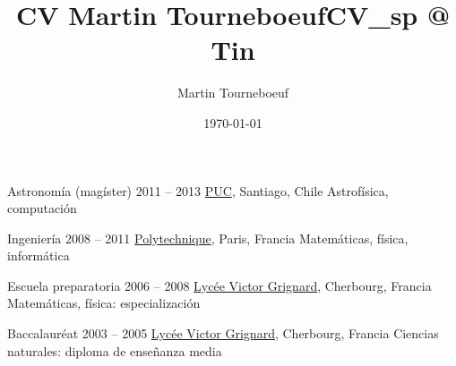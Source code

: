 \def\tbflanguage{spanish}

\ifx\HCode\undefined
  \providecommand\tbfbordertop{1.2}
  \providecommand\tbfborderleft{0.7}
  \providecommand\tbfwidth{12.4}
\else
  \providecommand\tbfbordertop{1}
  \providecommand\tbfborderleft{0.7}
  \providecommand\tbfwidth{12.4}
\fi

\ifx\HCode\undefined

%
\else

%
\fi

\ifx\HCode\undefined
  \title{CV Martin Tourneboeuf}
\else
  \title{CV_sp @ Tin}
\fi
\author{Martin Tourneboeuf}
\date{\today}









\begin{coordinatelist}
\end{coordinatelist}



\pgfmathsetmacro{\tbfyeary}{\tbfbordertop+3.1}

\begin{yearlist}[7.7][\tbfborderleft][\tbfyeary]


\item[Astronomía (magíster)]{2011 -- 2013}
  {
  \href{http://www.uc.cl/}{PUC}, Santiago, Chile
  }
  {    Astrofísica, computación}


\item[Ingeniería]{2008 -- 2011}
  {
  \tbfix
  \href{https://www.polytechnique.edu/}{Polytechnique}, Paris, Francia
  }
  {    Matemáticas, física, informática}


\item[Escuela preparatoria]{2006 -- 2008}
  {
  \href{http://www.lycee-grignard.fr/}{Lycée Victor Grignard}, Cherbourg, Francia
  }
  {    Matemáticas, física: especialización}


\item[Baccalaur\'eat]{2003 -- 2005}
  {
  \href{http://www.lycee-grignard.fr/}{Lycée Victor Grignard}, Cherbourg, Francia
  }
  {    Ciencias naturales: diploma de enseñanza media}

\end{yearlist}



